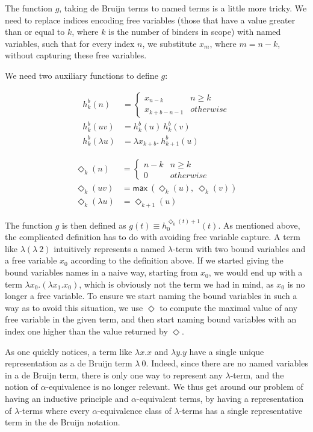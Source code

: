 \documentclass[a4paper, 12pt, twoside]{style/ociamthesis}
\theoremstyle{plain}
\theoremstyle{definition}
\theoremstyle{remark}
\renewcommand{\max}{\textsf{max}\ }
\begin{document}
The function \(g\), taking de Bruijn terms to named terms is a little
more tricky. We need to replace indices encoding free variables (those
that have a value greater than or equal to \(k\), where \(k\) is the
number of binders in scope) with named variables, such that for every
index \(n\), we substitute \(x_m\), where \(m = n-k\), without capturing
these free variables.

We need two auxiliary functions to define \(g\):

\begin{align*} 
h_k^b(n) &= \begin{cases}
x_{n-k} & n \geq k\\
x_{k+b-n-1} & otherwise
\end{cases}\\
h_k^b(uv) &= h_k^b(u)\ h_k^b(v)\\
h_k^b(\lambda u) &= \lambda x_{k+b}.\ h_{k+1}^b(u)
\end{align*}

\begin{align*} 
\Diamond_k(n) &= \begin{cases}
n-k & n \geq k\\
0 & otherwise
\end{cases}\\
\Diamond_k(uv) &= \max (\Diamond_k(u),\ \Diamond_k(v))\\
\Diamond_k(\lambda u) &= \Diamond_{k+1}(u)
\end{align*}

The function \(g\) is then defined as
\(g(t) \equiv h_0^{\Diamond_0(t)+1}(t)\). As mentioned above, the
complicated definition has to do with avoiding free variable capture. A
term like \(\lambda (\lambda\ 2)\) intuitively represents a named
\(\lambda\)-term with two bound variables and a free variable \(x_0\)
according to the definition above. If we started giving the bound
variables names in a naive way, starting from \(x_0\), we would end up
with a term \(\lambda x_0.(\lambda x_1.x_0)\), which is obviously not
the term we had in mind, as \(x_0\) is no longer a free variable. To
ensure we start naming the bound variables in such a way as to avoid
this situation, we use \(\Diamond\) to compute the maximal value of any
free variable in the given term, and then start naming bound variables
with an index one higher than the value returned by \(\Diamond\).

As one quickly notices, a term like \(\lambda x.x\) and \(\lambda y.y\)
have a single unique representation as a de Bruijn term \(\lambda\ 0\).
Indeed, since there are no named variables in a de Bruijn term, there is
only one way to represent any \(\lambda\)-term, and the notion of
\(\alpha\)-equivalence is no longer relevant. We thus get around our
problem of having an inductive principle and \(\alpha\)-equivalent
terms, by having a representation of \(\lambda\)-terms where every
\(\alpha\)-equivalence class of \(\lambda\)-terms has a single
representative term in the de Bruijn notation.
\end{document}
